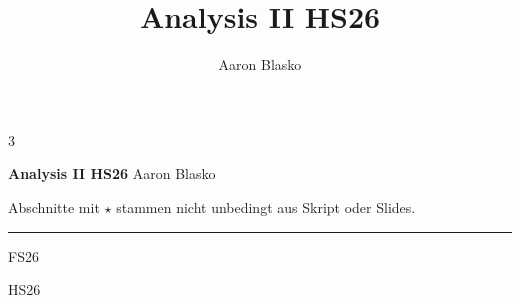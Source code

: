 \documentclass[8pt, a4paper]{extarticle}
\title{Analysis II HS26}
\author{Aaron Blasko}
\date{}
\numberwithin{equation}{section}
\begin{document}
\begin{multicols*}{3}

    {\large \textbf{Analysis II HS26}}
    Aaron Blasko

    Abschnitte mit $\star$ stammen nicht unbedingt aus Skript oder Slides.
    
    \vspace{4pt}
    \hrule

    \Large {\color{blue}{Analysis I}} \small FS26

    
    

    \setcounter{section}{0}
    \pagebreak

    \Large {\color{red}{Analysis II}} \small HS26


    \pagebreak

    


\end{multicols*}

\pagebreak

\clearpage
\end{document}
